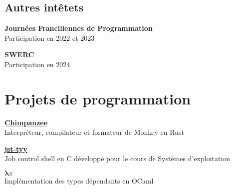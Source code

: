 \documentclass[12pt]{article}
\newcommand{\entry}[4]{{{\textbf{#1}}} \hfill #3 \\ #2 \hfill #4}
\begin{document}
\begin{paracol}{2}
	\medskip
	\switchcolumn

	\section{Autres intêtets}


	\textbf{Journées Franciliennes de Programmation}\\
	\noindent Participation en 2022 et 2023

	\textbf{SWERC}\\
	\noindent Participation en 2024
	\bigskip


\end{paracol}

\section{Projets de programmation}

\begin{paracol}{2}
	\entry{\href{https://github.com/Yag000/chimpanzee}{Chimpanzee}}{Interpréteur, compilateur et formateur de Monkey en Rust}{ }{ }
	\medskip
	\switchcolumn

	\entry{\href{https://github.com/Yag000/jsh-tyy}{jst-tyy}}{Job control shell en C développé pour le cours de Systèmes d'exploitation}{ }{ }
	\medskip
	\switchcolumn

	\entry{\href{https://moule.informatique.univ-paris-diderot.fr/iglesias/U3bbU3c0}{$\pmb\lambda\pi$}}{Implémentation des types dépendants en OCaml}{ }{ }
	\medskip
	\switchcolumn






\end{paracol}



\vspace*{\fill}
\end{document}
